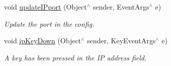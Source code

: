 \begin{DoxyCompactItemize}
void \hyperlink{classConfigWinWindow_ac1a7295061c09db580be48222baef958}{update\+I\+Pport} (Object$^\wedge$ sender, Event\+Args$^\wedge$ e)
\begin{DoxyCompactList}\small\item\em Update the port in the config. \end{DoxyCompactList}\item 
\mbox{\label{classConfigWinWindow_a04f73656ff5be88aa0497d75557c2229}} 
void \hyperlink{classConfigWinWindow_a04f73656ff5be88aa0497d75557c2229}{ip\+Key\+Down} (Object$^\wedge$ sender, Key\+Event\+Args$^\wedge$ e)
\begin{DoxyCompactList}\small\item\em A key has been pressed in the IP address field. \end{DoxyCompactList}\end{DoxyCompactItemize}
